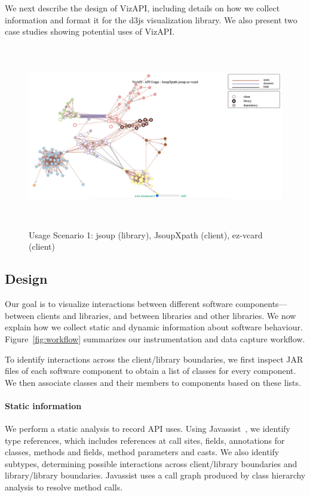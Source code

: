 \label{sec:viz-api}

We next describe the design of VizAPI, including details on how we
collect information and format it for the d3js visualization
library. We also present two case studies showing potential uses of
VizAPI.

\begin{figure}[h]
\begin{center}
\includegraphics[scale=1,width=15cm,height=8cm]{images/usage-scenario1.png}
\caption{Usage Scenario 1: jsoup (library), JsoupXpath (client), ez-vcard (client)}
\label{fig:usagescenario1}
\end{center}
\end{figure}

\subsection{Design}
\label{subsec:collecting-data}
Our goal is to visualize interactions between different software components---between
clients and libraries, and between libraries and other libraries. We now explain
how we collect static and dynamic information about software behaviour.
Figure~\ref{fig:workflow} summarizes our instrumentation and
data capture workflow. 

To identify interactions across the client/library boundaries,
we first inspect JAR files of each software component to obtain a list of
classes for every component. We then associate classes and their members to
components based on these lists.

\paragraph{Static information} We perform a static analysis to record
API uses. Using Javassist~\cite{chiba00:_load_struc_reflec_java}, we identify type
references, which includes references at call sites, fields, annotations for 
classes, methods and fields, method parameters and casts. 
We also identify subtypes, determining possible 
interactions across client/library boundaries and library/library boundaries.
Javassist uses
a call graph produced by class hierarchy analysis to resolve method calls.

